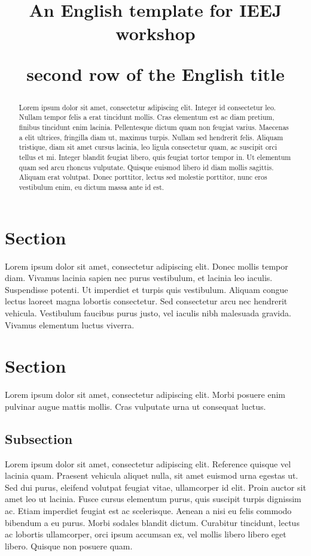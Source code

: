 \documentclass[english,fleqn]{ieej-tec2}%
\title{An English template for IEEJ workshop \par second row of the English title}
\begin{document}
\begin{abstract}
Lorem ipsum dolor sit amet, consectetur adipiscing elit. Integer id consectetur leo. Nullam tempor felis a erat tincidunt mollis. Cras elementum est ac diam pretium, finibus tincidunt enim lacinia. Pellentesque dictum quam non feugiat varius. Maecenas a elit ultrices, fringilla diam ut, maximus turpis. Nullam sed hendrerit felis. Aliquam tristique, diam sit amet cursus lacinia, leo ligula consectetur quam, ac suscipit orci tellus et mi. Integer blandit feugiat libero, quis feugiat tortor tempor in. Ut elementum quam sed arcu rhoncus vulputate. Quisque euismod libero id diam mollis sagittis. Aliquam erat volutpat. Donec porttitor, lectus sed molestie porttitor, nunc eros vestibulum enim, eu dictum massa ante id est.
\end{abstract}
%
\maketitle
%
\section{Section}
Lorem ipsum dolor sit amet, consectetur adipiscing elit. Donec mollis tempor diam. Vivamus lacinia sapien nec purus vestibulum, et lacinia leo iaculis. Suspendisse potenti. Ut imperdiet et turpis quis vestibulum. Aliquam congue lectus laoreet magna lobortis consectetur. Sed consectetur arcu nec hendrerit vehicula. Vestibulum faucibus purus justo, vel iaculis nibh malesuada gravida. Vivamus elementum luctus viverra.

\section{Section}
Lorem ipsum dolor sit amet, consectetur adipiscing elit. Morbi posuere enim pulvinar augue mattis mollis. Cras vulputate urna ut consequat luctus.

\subsection{Subsection}
Lorem ipsum dolor sit amet, consectetur adipiscing elit. Reference\cite{IEEJformat} quisque vel lacinia quam. Praesent vehicula\cite{bib2,bib3} aliquet nulla, sit amet euismod urna egestas ut. Sed dui purus, eleifend volutpat feugiat vitae, ullamcorper id elit. Proin auctor\cite{bib4,bib5,bib6,bib7} sit amet leo ut lacinia. Fusce cursus elementum purus, quis suscipit turpis dignissim ac. Etiam imperdiet feugiat est ac scelerisque. Aenean a nisi eu felis commodo bibendum a eu purus. Morbi sodales blandit dictum. Curabitur tincidunt, lectus ac lobortis ullamcorper, orci ipsum accumsan ex, vel mollis libero libero eget libero. Quisque non posuere quam.
\end{document}
